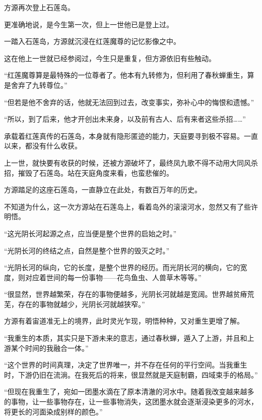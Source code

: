 
\begin{this_body}



方源再次登上石莲岛。

更准确地说，是今生第一次，但上一世他已是登上过。

一踏入石莲岛，方源就沉浸在红莲魔尊的记忆影像之中。

这在他上一世就已经参阅过，今生只是重复，但方源依旧有些触动。

“红莲魔尊算是最特殊的一位尊者了。他本有九转修为，但利用了春秋蝉重生，算是舍弃了九转尊位。”

“但若是他不舍弃的话，他就无法回到过去，改变事实，弥补心中的悔恨和遗憾。”

“所以，到了后来，他才开创出未来身，以及前有古人、后有来者这些杀招……”

承载着红莲真传的石莲岛，本身就有隐形匿迹的能力，天庭要寻到极不容易。一直以来，都没有什么收获。

上一世，就快要有收获的时候，还被方源破坏了，最终凤九歌不得不动用大同风杀招，摧毁了石莲岛。站在天庭角度来看，也蛮悲催的。

方源踏足的这座石莲岛，一直静立在此处，有数百万年的历史。

不知道为什么，这一次方源站在石莲岛上，看着岛外的滚滚河水，忽然又有了些许明悟。

“这光阴长河起源之点，应当便是整个世界的启始之时。”

“光阴长河的终结之点，自然是整个世界的毁灭之时。”

“光阴长河的纵向，它的长度，是整个世界的经历。而光阴长河的横向，它的宽度，则对应着世间的每一份事物——花鸟鱼虫、人兽草木等等。”

“很显然，世界越繁荣，存在的事物便越多，光阴长河就越是宽阔。世界越贫瘠荒芜，存在的事物就越少，光阴长河就越狭窄。”

方源有着宙道准无上的境界，此时灵光乍现，明悟种种，又对重生更增了解。

“我重生的本质，其实只是下游未来的意志，通过春秋蝉，遁入了上游，并且和上游某个时间的我融合一体。”

“这个世界的时间真理，决定了世界唯一，并不存在任何的平行空间。当我重生时，下游仍旧在流淌。在我死后的将来，很显然就是天庭制霸，四域束手的格局。”

“但现在我重生了，宛如一团墨水滴在了原本清澈的河水中。随着我改变越来越多的事物，让一些事物存在，让一些事物消失，这团墨水就会逐渐浸染更多的河水，将更长的河面染成别样的颜色。”


\end{this_body}
